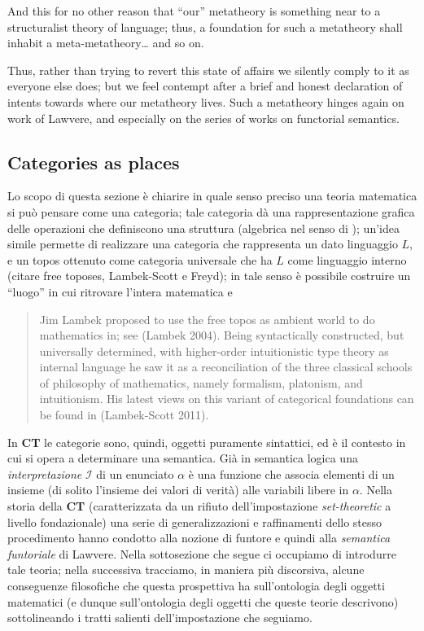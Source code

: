 And this for no other reason that ``our'' metatheory is something near to a structuralist theory of language; thus, a foundation for such a metatheory shall inhabit a meta-metatheory\dots{} and so on.

Thus, rather than trying to revert this state of affairs we silently comply to it as everyone else does; but we feel contempt after a brief and honest declaration of intents towards where our metatheory lives. Such a metatheory hinges again on work of Lawvere, and especially on the series of works on functorial semantics.
\subsection{Categories as places}
Lo scopo di questa sezione è chiarire in quale senso preciso una teoria matematica si può pensare come una categoria; tale categoria dà una rappresentazione grafica delle operazioni che definiscono una struttura (algebrica nel senso di \cite{Kurosh:o:altri}); un'idea simile permette di realizzare una categoria che rappresenta un dato linguaggio $L$, e un topos ottenuto come categoria universale che ha $L$ come linguaggio interno (citare free toposes, Lambek-Scott e Freyd); in tale senso è possibile costruire un ``luogo'' in cui ritrovare l'intera matematica e 
\begin{quote}
  Jim Lambek proposed to use the free topos as ambient world to do mathematics in; see (Lambek 2004). Being syntactically constructed, but universally determined, with higher-order intuitionistic type theory as internal language he saw it as a reconciliation of the three classical schools of philosophy of mathematics, namely formalism, platonism, and intuitionism. His latest views on this variant of categorical foundations can be found in (Lambek-Scott 2011).
\end{quote}
In \textbf{CT} le categorie sono, quindi, oggetti puramente sintattici, ed è il contesto in cui si opera a determinare una semantica. Già in semantica logica una \emph{interpretazione} $\mathcal{I}$ di un enunciato $\alpha$ è una funzione che associa elementi di un insieme (di solito l'insieme dei valori di verità) alle variabili libere in $\alpha$. Nella storia della \textbf{CT} (caratterizzata da un rifiuto dell'impostazione \emph{set-theoretic} a livello fondazionale) una serie di generalizzazioni e raffinamenti dello stesso procedimento hanno condotto alla nozione di funtore e quindi alla \emph{semantica funtoriale} di Lawvere. Nella sottosezione che segue ci occupiamo di introdurre tale teoria; nella successiva tracciamo, in maniera più discorsiva, alcune conseguenze filosofiche che questa prospettiva ha sull'ontologia degli oggetti matematici (e dunque sull'ontologia degli oggetti che queste teorie descrivono) sottolineando i tratti salienti dell'impostazione che seguiamo.
